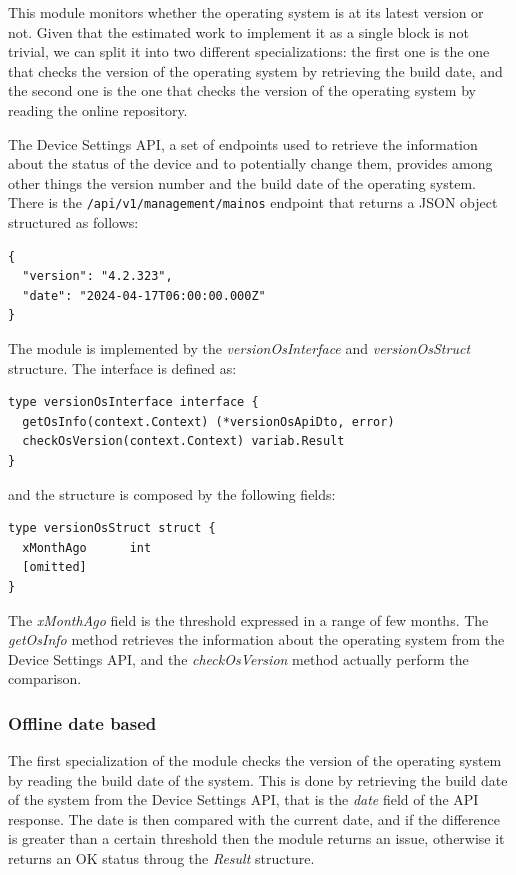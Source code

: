 This module monitors whether the operating system is at its latest version or not. Given that the estimated work to implement it as a single block is not trivial, we can split it into two different specializations: the first one is the one that checks the version of the operating system by retrieving the build date, and the second one is the one that checks the version of the operating system by reading the online repository.

The Device Settings API, a set of endpoints used to retrieve the information about the status of the device and to potentially change them, provides among other things the version number and the build date of the operating system. There is the \texttt{/api/v1/management/mainos} endpoint that returns a JSON object structured as follows:

\begin{lstlisting}
{
  "version": "4.2.323",
  "date": "2024-04-17T06:00:00.000Z"
}
\end{lstlisting}

The module is implemented by the \textit{versionOsInterface} and \textit{versionOsStruct} structure. The interface is defined as:

\begin{lstlisting}[style=golang]
type versionOsInterface interface {
  getOsInfo(context.Context) (*versionOsApiDto, error)
  checkOsVersion(context.Context) variab.Result
}
\end{lstlisting}

and the structure is composed by the following fields:

\begin{lstlisting}[style=golang]
type versionOsStruct struct {
  xMonthAgo      int
  [omitted]
}
\end{lstlisting}

The \textit{xMonthAgo} field is the threshold expressed in a range of few months. The \textit{getOsInfo} method retrieves the information about the operating system from the Device Settings API, and the \textit{checkOsVersion} method actually perform the comparison.

\subsubsection{Offline date based}

The first specialization of the module checks the version of the operating system by reading the build date of the system. This is done by retrieving the build date of the system from the Device Settings API, that is the \textit{date} field of the API response. The date is then compared with the current date, and if the difference is greater than a certain threshold then the module returns an issue, otherwise it returns an OK status throug the \textit{Result} structure.

